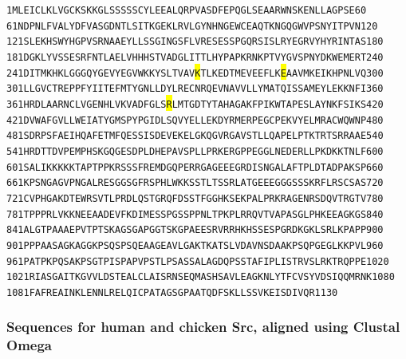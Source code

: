 \documentclass[aps,pre,twocolumn,nofootinbib,superscriptaddress,linenumbers]{revtex4-1}
\begin{document}
\begin{alltt}
1     MLEICLKLVG CKSKKGLSSS SSCYLEEALQ RPVASDFEPQ GLSEAARWNS KENLLAGPSE    60
61    NDPNLFVALY DFVASGDNTL SITKGEKLRV LGYNHNGEWC EAQTKNGQGW VPSNYITPVN   120
121   SLEKHSWYHG PVSRNAAEYL LSSGINGSFL VRESESSPGQ RSISLRYEGR VYHYRINTAS   180
181   DGKLYVSSES RFNTLAELVH HHSTVADGLI TTLHYPAPKR NKPTVYGVSP NYDKWEMERT   240
241   D{\color{red}ITMKHKLGG GQYGEVYEGV WKKYSLTVAV {\setlength{\fboxsep}{0pt}\colorbox{yellow}{K}}TLKEDTMEV EEFLK{\setlength{\fboxsep}{0pt}\colorbox{yellow}{E}}AAVM KEIKHPNLVQ}   300
301   {\color{red}LLGVCTREPP FYIITEFMTY GNLLDYLREC NRQEVNAVVL LYMATQISSA MEYLEKKNFI}   360
361   {\color{red}HRDLAARNCL VGENHLVKVA DFGLS{\setlength{\fboxsep}{0pt}\colorbox{yellow}{R}}LMTG DTYTAHAGAK FPIKWTAPES LAYNKFSIKS}   420
421   {\color{red}DVWAFGVLLW EIATYGMSPY PGIDLSQVYE LLEKDYRMER PEGCPEKVYE LMRACWQWNP}   480
481   {\color{red}SDRPSFAEIH QAF}ETMFQES SISDEVEKEL GKQGVRGAVS TLLQAPELPT KTRTSRRAAE   540
541   HRDTTDVPEM PHSKGQGESD PLDHEPAVSP LLPRKERGPP EGGLNEDERL LPKDKKTNLF   600
601   SALIKKKKKT APTPPKRSSS FREMDGQPER RGAGEEEGRD ISNGALAFTP LDTADPAKSP   660
661   KPSNGAGVPN GALRESGGSG FRSPHLWKKS STLTSSRLAT GEEEGGGSSS KRFLRSCSAS   720
721   CVPHGAKDTE WRSVTLPRDL QSTGRQFDSS TFGGHKSEKP ALPRKRAGEN RSDQVTRGTV   780
781   TPPPRLVKKN EEAADEVFKD IMESSPGSSP PNLTPKPLRR QVTVAPASGL PHKEEAGKGS   840
841   ALGTPAAAEP VTPTSKAGSG APGGTSKGPA EESRVRRHKH SSESPGRDKG KLSRLKPAPP   900
901   PPPAASAGKA GGKPSQSPSQ EAAGEAVLGA KTKATSLVDA VNSDAAKPSQ PGEGLKKPVL   960
961   PATPKPQSAK PSGTPISPAP VPSTLPSASS ALAGDQPSST AFIPLISTRV SLRKTRQPPE  1020
1021  RIASGAITKG VVLDSTEALC LAISRNSEQM ASHSAVLEAG KNLYTFCVSY VDSIQQMRNK  1080
1081  FAFREAINKL ENNLRELQIC PATAGSGPAA TQDFSKLLSS VKEISDIVQR             1130
\end{alltt}

\subsubsection*{Sequences for human and chicken Src, aligned using Clustal Omega}
\end{document}
